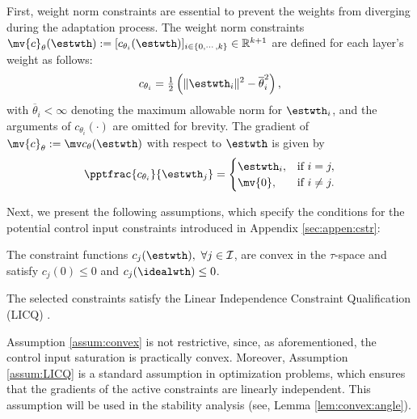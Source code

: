 \documentclass[journal]{IEEEtran}
\begin{document}
First, weight norm constraints are essential to prevent the weights from diverging during the adaptation process.
The weight norm constraints $\mv{c}_{\theta}(\estwth):= [c_{\theta_i}(\estwth)]_{i\in\{0,\cdots ,k\}}\in\mathbb R^{k+1}$ are defined for each layer's weight as follows:
\begin{equation}
    c_{\theta_i}
    =
    \tfrac{1}{2}
    \left(
        \Vert \estwth_i\Vert^2 
        -
        \overline\theta_i^2 
    \right)    
    ,
    \label{eq:cstr:weight:ball}
\end{equation}
with $\overline\theta_i<\infty$ denoting the maximum allowable norm for $\estwth_i$, and the arguments of $c_{\theta_i}(\cdot)$ are omitted for brevity.
The gradient of $\mv{c}_\theta:=\mv c_{\theta}(\estwth)$ with respect to $\estwth$ is given by
\begin{equation}
    \pptfrac{c_{\theta_i}}{\estwth_j} 
    =
    \begin{cases}
        \estwth_i,
        &
        \text{if } i=j,
        \\
        \mv{0},
        &
        \text{if } i\ne j
        .
    \end{cases} 
    \label{eq:cstr:weight:ball:grad}
\end{equation}

Next, we present the following assumptions, which specify the conditions for the potential control input constraints introduced in Appendix \ref{sec:appen:cstr}:

\begin{assum}
    The constraint functions $c_j(\estwth),\ \forall j\in\mathcal I$, are convex in the $\tau$-space and satisfy $c_j(0) \le 0$ and $c_j(\idealwth)\le 0$.
    \label{assum:convex}
\end{assum}

\begin{assum}
    The selected constraints satisfy the Linear Independence Constraint Qualification (LICQ) \cite[Chap.~12 Def.~12.1]{Nocedal:2006aa}.
    \label{assum:LICQ}
\end{assum}

\begin{remark}
    Assumption \ref{assum:convex} is not restrictive, since, as aforementioned, the control input saturation is practically convex.
    Moreover, Assumption \ref{assum:LICQ} is a standard assumption in optimization problems, which ensures that the gradients of the active constraints are linearly independent.
    This assumption will be used in the stability analysis (see, Lemma \ref{lem:convex:angle}).
\end{remark}
\end{document}
